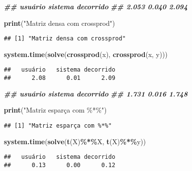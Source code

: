 \documentclass[
]{article}
\newenvironment{Shaded}{\begin{snugshade}}{\end{snugshade}}
\newcommand{\DocumentationTok}[1]{\textcolor[rgb]{0.56,0.35,0.01}{\textbf{\textit{#1}}}}
\newcommand{\FunctionTok}[1]{\textcolor[rgb]{0.13,0.29,0.53}{\textbf{#1}}}
\newcommand{\NormalTok}[1]{#1}
\newcommand{\SpecialCharTok}[1]{\textcolor[rgb]{0.81,0.36,0.00}{\textbf{#1}}}
\newcommand{\StringTok}[1]{\textcolor[rgb]{0.31,0.60,0.02}{#1}}
\begin{document}
\begin{Shaded}
\begin{Highlighting}[]
\DocumentationTok{\#\# usuário sistema decorrido}
\DocumentationTok{\#\# 2.053 0.040 2.094}

\FunctionTok{print}\NormalTok{(}\StringTok{"Matriz densa com crossprod"}\NormalTok{)}
\end{Highlighting}
\end{Shaded}

\begin{verbatim}
## [1] "Matriz densa com crossprod"
\end{verbatim}

\begin{Shaded}
\begin{Highlighting}[]
\FunctionTok{system.time}\NormalTok{(}\FunctionTok{solve}\NormalTok{(}\FunctionTok{crossprod}\NormalTok{(x), }\FunctionTok{crossprod}\NormalTok{(x, y)))}
\end{Highlighting}
\end{Shaded}

\begin{verbatim}
##   usuário   sistema decorrido 
##      2.08      0.01      2.09
\end{verbatim}

\begin{Shaded}
\begin{Highlighting}[]
\DocumentationTok{\#\# usuário sistema decorrido}
\DocumentationTok{\#\# 1.731 0.016 1.748}

\FunctionTok{print}\NormalTok{(}\StringTok{"Matriz esparça com \%*\%"}\NormalTok{)}
\end{Highlighting}
\end{Shaded}

\begin{verbatim}
## [1] "Matriz esparça com %*%"
\end{verbatim}

\begin{Shaded}
\begin{Highlighting}[]
\FunctionTok{system.time}\NormalTok{(}\FunctionTok{solve}\NormalTok{(}\FunctionTok{t}\NormalTok{(X)}\SpecialCharTok{\%*\%}\NormalTok{X, }\FunctionTok{t}\NormalTok{(X)}\SpecialCharTok{\%*\%}\NormalTok{y))}
\end{Highlighting}
\end{Shaded}

\begin{verbatim}
##   usuário   sistema decorrido 
##      0.13      0.00      0.12
\end{verbatim}
\end{document}
